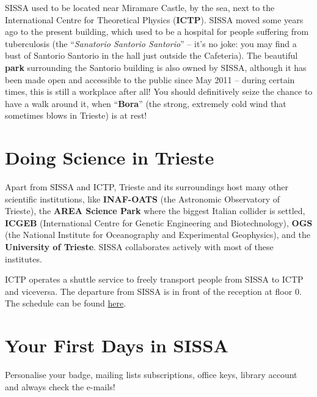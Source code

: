 \documentclass{sissavademecum}
\begin{document}
SISSA used to be located near Miramare Castle, by the sea, next to the International Centre for Theoretical Physics (\textbf{ICTP}). SISSA moved some years ago to the present building, which used to be a hospital for people suffering from tuberculosis (the ``\textit{Sanatorio Santorio Santorio}'' -- it's no joke: you may find a bust of Santorio Santorio in the hall just outside the Cafeteria). The beautiful \textbf{park }surrounding the Santorio building is also owned by SISSA, although it has been made open and accessible to the public since May 2011 -- during certain times, this is still a workplace after all! You should definitively seize the chance to have a walk around it, when ``\textbf{Bora}'' (the strong, extremely cold wind that sometimes blows in Trieste) is at rest!


\section{Doing Science in Trieste}

Apart from SISSA and ICTP, Trieste and its surroundings host many other scientific institutions, like \textbf{INAF-OATS }(the Astronomic Observatory of Trieste), the \textbf{AREA Science Park} where the biggest Italian collider is settled, \textbf{ICGEB }(International Centre for Genetic Engineering and Biotechnology), \textbf{OGS }(the National Institute for Oceanography and Experimental Geophysics), and the \textbf{University of Trieste}. SISSA collaborates actively with most of these institutes.

ICTP operates a shuttle service to freely transport people from SISSA to ICTP and viceversa. The departure from SISSA is in front of the reception at floor $0$. The schedule can be found \href{https://www.ictp.it/visit-ictp/transportation/campus-shuttle-services.aspx#close}{here}.


\section{Your First Days in SISSA}

Personalise your badge, mailing lists subscriptions, office keys, library account and always check the e-mails!
\end{document}

